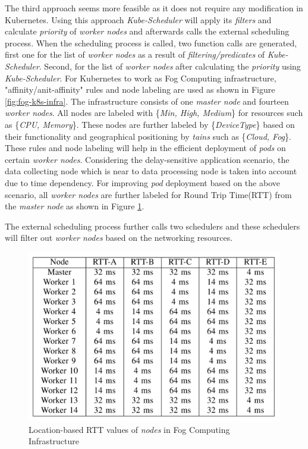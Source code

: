 The third approach seems more feasible as it does not require any modification in Kubernetes. Using this approach \emph{Kube-Scheduler} will apply its \emph{filters} and calculate \emph{priority} of \emph{worker nodes} and afterwards calls the external scheduling process\cite{Santos2019}. When the scheduling process is called, two function calls are generated\cite{Santos2019}, first one for the list of \emph{worker nodes} as a result of \emph{filtering/predicates} of \emph{Kube-Scheduler}\cite{Santos2019}. Second, for the list of \emph{worker nodes} after calculating the \emph{priority} using \emph{Kube-Scheduler}\cite{Santos2019}. For Kubernetes to work as Fog Computing infrastructure, "affinity/anit-affinity" rules and node labeling are used as shown in Figure \ref{fig:fog-k8s-infra}. The infrastructure consists of one \emph{master node} and fourteen \emph{worker nodes}. All nodes are labeled with \{\emph{Min, High, Medium}\} for resources such as \{\emph{CPU, Memory}\}\cite{Santos2019}. These nodes are further labeled by \{\emph{DeviceType}\} based on their functionality and geographical positioning by \emph{tains} such as \{\emph{Cloud, Fog}\}\cite{Santos2019}. These rules and node labeling will help in the efficient deployment of \emph{pods} on certain \emph{worker nodes}. Considering the delay-sensitive application scenario, the data collecting node which is near to data processing node is taken into account due to time dependency\cite{Santos2019}. For improving \emph{pod} deployment based on the above scenario, all \emph{worker nodes} are further labeled for Round Trip Time(RTT) from the \emph{master node}\cite{Santos2019} as shown in Figure \ref{fig:k8s-rtt}.\par
The external scheduling process further calls two schedulers and these schedulers will filter out \emph{worker nodes} based on the networking resources.
\begin{figure}
  \centering
  \includegraphics[width=\linewidth]{figures/mlcn-k8s-rtt.pdf}
  \caption{Location-based RTT values of \emph{nodes} in Fog Computing Infrastructure\cite{Santos2019}}
  \label{fig:k8s-rtt}
\end{figure}
